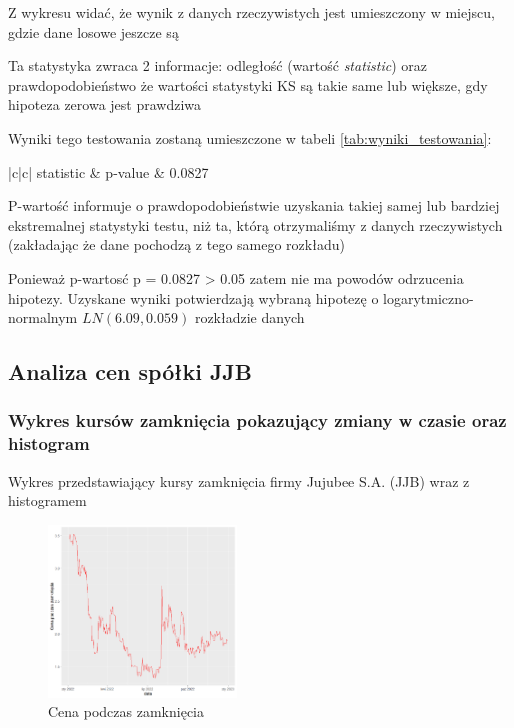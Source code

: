 \documentclass[a4paper,11pt]{article}
\def\\{\hfill\break}
\begin{document}
Z wykresu widać, że wynik z danych rzeczywistych jest umieszczony w miejscu, gdzie dane losowe jeszcze są



Ta statystyka zwraca 2 informacje: odległość (wartość \textit{statistic}) oraz prawdopodobieństwo że wartości statystyki KS są takie same lub większe, gdy hipoteza zerowa jest prawdziwa

Wyniki tego testowania zostaną umieszczone w tabeli \ref{tab:wyniki_testowania}:

\begin{table}[!htb]
  \centering
  \begin{tabular}{|c|c|}
    \hline
     statistic & p-value   \\
      & 0.0827\\
    \hline
  \end{tabular}
  \caption{Wartość statystyki KS w testowaniu hipotezy}
  \label{tab:wyniki_testowania}
\end{table}


P-wartość informuje o prawdopodobieństwie uzyskania takiej samej lub bardziej ekstremalnej statystyki testu, niż ta, którą otrzymaliśmy z danych rzeczywistych (zakładając że dane pochodzą z tego samego rozkładu)

Ponieważ p-wartosć  p = 0.0827 > 0.05 zatem nie ma powodów odrzucenia hipotezy. Uzyskane wyniki potwierdzają wybraną hipotezę  o logarytmiczno-normalnym $LN(6.09, 0.059)$ rozkładzie danych

\newpage
\subsection{Analiza cen spółki JJB}
\subsubsection{Wykres kursów zamknięcia pokazujący zmiany w czasie oraz histogram}

Wykres przedstawiający kursy zamknięcia firmy Jujubee S.A. (JJB) wraz z histogramem
\begin{figure}[h]
  \includegraphics[width=5cm]{jjb_cena_podczas_zamkn.png}
  \caption{Cena podczas zamknięcia}
  \label{fig:jjb_cena_podcaz_zamkn}
\end{figure}
\end{document}

